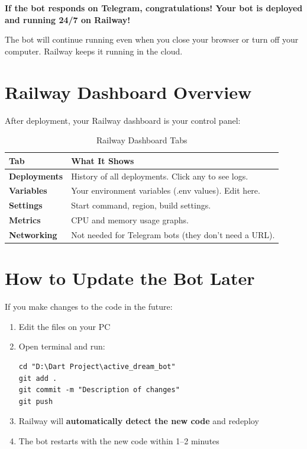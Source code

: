 \begin{successbox}
\textbf{If the bot responds on Telegram, congratulations! Your bot is deployed and running 24/7 on Railway!}

The bot will continue running even when you close your browser or turn off your computer. Railway keeps it running in the cloud.
\end{successbox}

\section{Railway Dashboard Overview}

After deployment, your Railway dashboard is your control panel:

\begin{table}[H]
\centering
\caption{Railway Dashboard Tabs}
\begin{tabularx}{\textwidth}{|l|X|}
\hline
\textbf{Tab} & \textbf{What It Shows} \\
\hline
\textbf{Deployments} & History of all deployments. Click any to see logs. \\
\hline
\textbf{Variables} & Your environment variables (.env values). Edit here. \\
\hline
\textbf{Settings} & Start command, region, build settings. \\
\hline
\textbf{Metrics} & CPU and memory usage graphs. \\
\hline
\textbf{Networking} & Not needed for Telegram bots (they don't need a URL). \\
\hline
\end{tabularx}
\end{table}

\section{How to Update the Bot Later}

If you make changes to the code in the future:

\begin{enumerate}[leftmargin=1.5cm]
    \item Edit the files on your PC
    \item Open terminal and run:
    \begin{lstlisting}[style=termstyle]
cd "D:\Dart Project\active_dream_bot"
git add .
git commit -m "Description of changes"
git push
    \end{lstlisting}
    \item Railway will \textbf{automatically detect the new code} and redeploy
    \item The bot restarts with the new code within 1--2 minutes
\end{enumerate}

